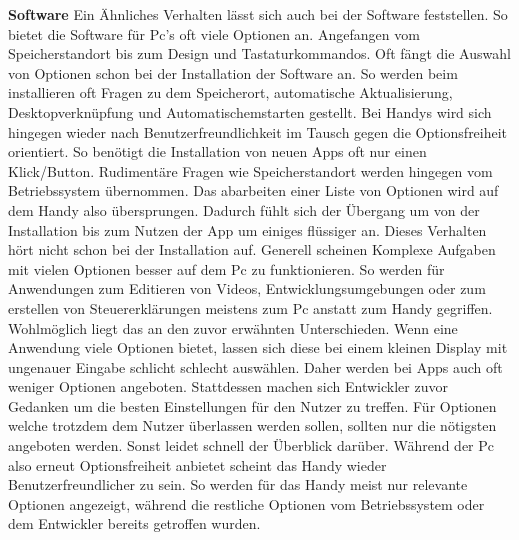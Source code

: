 
\myNewSection
\textbf{Software} Ein Ähnliches Verhalten lässt sich auch bei der Software feststellen. So bietet die Software für Pc's oft viele Optionen an. Angefangen vom Speicherstandort bis zum Design und Tastaturkommandos. Oft fängt die Auswahl von Optionen schon bei der Installation der Software an. So werden beim installieren oft Fragen zu dem Speicherort, automatische Aktualisierung, Desktopverknüpfung und Automatischemstarten gestellt.\newline%
Bei Handys wird sich hingegen wieder nach Benutzerfreundlichkeit im Tausch gegen die Optionsfreiheit orientiert. So benötigt die Installation von neuen Apps oft nur einen Klick/Button. Rudimentäre Fragen wie Speicherstandort werden hingegen vom Betriebssystem übernommen. Das abarbeiten einer Liste von Optionen wird auf dem Handy also übersprungen. Dadurch fühlt sich der Übergang um von der Installation bis zum Nutzen der App um einiges flüssiger an. \newline%
Dieses Verhalten hört nicht schon bei der Installation auf. Generell scheinen Komplexe Aufgaben mit vielen Optionen besser auf dem Pc zu funktionieren. So werden für Anwendungen zum Editieren von Videos, Entwicklungsumgebungen oder zum erstellen von Steuererklärungen meistens zum Pc anstatt zum Handy gegriffen. Wohlmöglich liegt das an den zuvor erwähnten Unterschieden. Wenn eine Anwendung viele Optionen bietet, lassen sich diese bei einem kleinen Display mit ungenauer Eingabe schlicht schlecht auswählen.\newline%
Daher werden bei Apps auch oft weniger Optionen angeboten. Stattdessen machen sich Entwickler zuvor Gedanken um die besten Einstellungen für den Nutzer zu treffen. Für Optionen welche trotzdem dem Nutzer überlassen werden sollen, sollten nur die nötigsten angeboten werden. Sonst leidet schnell der Überblick darüber. \newline%
Während der Pc also erneut Optionsfreiheit anbietet scheint das Handy wieder Benutzerfreundlicher zu sein. So werden für das Handy meist nur relevante Optionen angezeigt, während die restliche Optionen vom Betriebssystem oder dem Entwickler bereits getroffen wurden.

